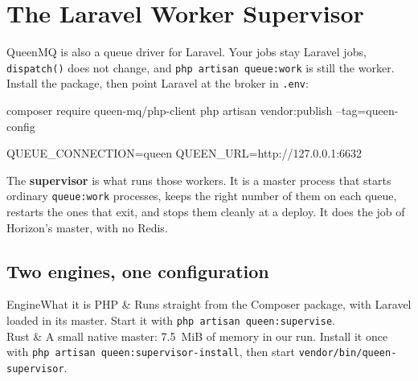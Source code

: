 
\section{The Laravel Worker Supervisor}

QueenMQ is also a queue driver for Laravel. Your jobs stay Laravel jobs, \texttt{dispatch()} does not
change, and \texttt{php artisan queue:work} is still the worker. Install the package, then point
Laravel at the broker in \texttt{.env}:

\begin{shell}
composer require queen-mq/php-client
php artisan vendor:publish --tag=queen-config
\end{shell}

\begin{shell}
QUEUE_CONNECTION=queen
QUEEN_URL=http://127.0.0.1:6632
\end{shell}

The \textbf{supervisor} is what runs those workers. It is a master process that starts ordinary
\texttt{queue:work} processes, keeps the right number of them on each queue, restarts the ones that
exit, and stops them cleanly at a deploy. It does the job of Horizon's master, with no Redis.



\subsection{Two engines, one configuration}

\begin{pairs}[0.12]{Engine}{What it is}
PHP & Runs straight from the Composer package, with Laravel loaded in its master. Start it with
\texttt{php artisan queen:supervise}. \\
Rust & A small native master: 7.5~MiB of memory in our run. Install it once with
\texttt{php artisan queen:supervisor-install}, then start \texttt{vendor/bin/queen-supervisor}. \\
\end{pairs}


